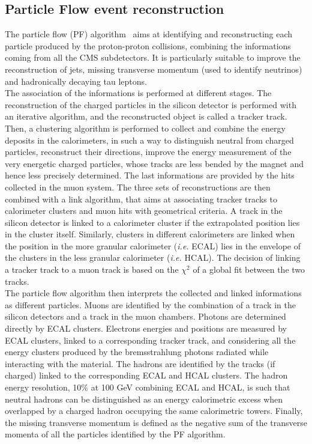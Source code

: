 \subsection{Particle Flow event reconstruction}
The particle flow (PF) algorithm~\cite{Sirunyan:2270046} aims at identifying and reconstructing each particle produced by the proton-proton collisions, combining the informations coming from all the CMS subdetectors. It is particularly suitable to improve the reconstruction of jets, missing transverse momentum (used to identify neutrinos) and hadronically decaying tau leptons.\\
The association of the informations is performed at different stages. The reconstruction of the charged particles in the silicon detector is performed with an iterative algorithm, and the reconstructed object is called a tracker track. Then, a clustering algorithm is performed to collect and combine the energy deposits in the calorimeters, in such a way to distinguish neutral from charged particles, reconstruct their directions, improve the energy measurement of the very energetic charged particles, whose tracks are less bended by the magnet and hence less precisely determined. The last informations are provided by the hits collected in the muon system. The three sets of reconstructions are then combined with a link algorithm, that aims at associating tracker tracks to calorimeter clusters and muon hits with geometrical criteria. A track in the silicon detector is linked to a calorimeter cluster if the extrapolated position lies in the cluster itself. Similarly, clusters in different calorimeters are linked when the position in the more granular calorimeter (\textit{i.e.} ECAL) lies in the envelope of the clusters in the less granular calorimeter (\textit{i.e.} HCAL). The decision of linking a tracker track to a muon track is based on the $\chi^2$ of a global fit between the two tracks.\\
The particle flow algorithm then interprets the collected and linked informations as different particles. Muons are identified by the combination of a track in the silicon detectors and a track in the muon chambers. Photons are determined directly by ECAL clusters. Electrons energies and positions are measured by ECAL clusters, linked to a corresponding tracker track, and considering all the energy clusters produced by the bremsstrahlung photons radiated while interacting with the material. The hadrons are identified by the tracks (if charged) linked to the corresponding ECAL and HCAL clusters. The hadron energy resolution, 10\% at 100 GeV combining ECAL and HCAL, is such that neutral hadrons can be distinguished as an energy calorimetric excess when overlapped by a charged hadron occupying the same calorimetric towers. Finally, the missing transverse momentum is defined as the negative sum of the transverse momenta of all the particles identified by the PF algorithm.\\

